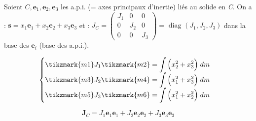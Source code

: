 \documentclass[a4paper]{article}
\begin{document}
\begin{itemize}
Soient $ C, \textbf{e}_1, \textbf{e}_2, \textbf{e}_3 $ les a.p.i. (= axes principaux d'inertie) liés au solide en \emph{C}. On a : $ \textbf{s} = x_1 \textbf{e}_1 + x_2 \textbf{e}_2 + x_3 \textbf{e}_3 $ et : $ J_C = \begin{pmatrix} J_1 & 0 & 0 \\ 0 & J_2 & 0 \\ 0 & 0 & J_3 \end{pmatrix} = \text{ diag } (J_1, J_2, J_3) $ dans la base des $ \textbf{e}_i $ (base des a.p.i.).

\begin{equation*} \begin{cases} \displaystyle
\tikzmark{m1}J_1\tikzmark{m2} = \int \Big( x_2^2 + x_3^2 \Big) \; d m \\ \displaystyle
\tikzmark{m3}J_2\tikzmark{m4} = \int \Big( x_1^2 + x_3^2 \Big) \; d m\\ \displaystyle
\tikzmark{m5}J_3\tikzmark{m6} = \int \Big( x_1^2 + x_2^2 \Big) \; d m
\end{cases} \end{equation*}

\[  \] %
\[ \textbf{J}_C = J_1 \textbf{e}_1 \textbf{e}_1 + J_2 \textbf{e}_2 \textbf{e}_2 + J_3 \textbf{e}_3 \textbf{e}_3 \]






\end{itemize}
\end{document}
